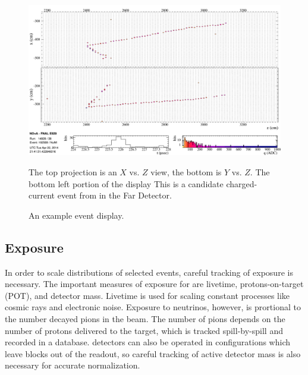 \begin{figure}
\begin{center}
\includegraphics[width=\textwidth]{figures/evd/evd_numu_cand.png}
\end{center}
\caption{An example \nova event display.}{The top projection is an $X$ vs. $Z$
view, the bottom is $Y$ vs. $Z$.
The bottom left portion of the display
This is a candidate \numu charged-current event from in the Far Detector.}
\label{eventDisplay}
\end{figure}


\subsection{Exposure}


In order to scale distributions of selected events, careful tracking
of exposure is necessary.
The important measures of exposure for \nova are livetime,
protons-on-target (POT), and detector mass.
Livetime is used for scaling constant processes
like cosmic rays and electronic noise.
Exposure to neutrinos, however, is prortional to the number decayed pions
in the \numi beam.
The number of pions depends on the number of protons delivered to the target,
which is tracked spill-by-spill and recorded in a database.
\nova detectors can also be operated in configurations which leave blocks
out of the readout, so careful tracking of active detector mass is also
necessary for accurate normalization.


